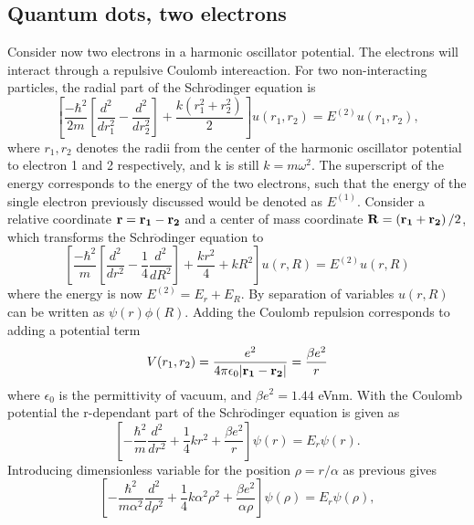\documentclass{emulateapj}
\begin{document}
\subsection{Quantum dots, two electrons}
Consider now two electrons in a harmonic oscillator potential. The electrons will interact through a repulsive Coulomb intereaction. For two non-interacting particles, the radial part of the Schr$\ddot{\mathrm{o}}$dinger equation is
%
\begin{equation*}
    \left[\frac{-\hbar^2}{2m}\left[\frac{d^2}{dr_1^2} - \frac{d^2}{dr_2^2}\right] + \frac{k\left(r_1^2 + r_2^2\right)}{2}\right]u(r_1,r_2) = E^{(2)}u(r_1,r_2),
\end{equation*}
%
where $r_1, r_2$ denotes the radii from the center of the harmonic oscillator potential to electron 1 and 2 respectively, and k is still $k = m\omega^2$. The superscript of the energy corresponds to the energy of the two electrons, such that the energy of the single electron previously discussed would be denoted as $E^{(1)}$. Consider a relative coordinate $\bold{r} = \bold{r_1} - \bold{r_2}$ and a center of mass coordinate $\bold{R} = \left(\bold{r_1} + \bold{r_2}\right)/2$, which transforms the Schr$\ddot{\mathrm{o}}$dinger equation to
%
\begin{equation*}
    \left[\frac{-\hbar^2}{m}\left[\frac{d^2}{dr^2} - \frac{1}{4}\frac{d^2}{dR^2}\right] + \frac{kr^2}{4} + kR^2\right]u(r,R) = E^{(2)}u(r,R)
\end{equation*}
%
where the energy is now $E^{(2)} = E_r + E_R$. By separation of variables $u(r,R)$ can be written as $\psi(r)\phi(R)$. Adding the Coulomb repulsion corresponds to adding a potential term
%
\begin{equation*}
    V(r_1,r_2) = \frac{e^2}{4\pi \epsilon_0 |\bold{r_1} - \bold{r_2}|} = \frac{\beta e^2}{r}
\end{equation*}
%
where $\epsilon_0$ is the permittivity of vacuum, and $\beta e^2 = 1.44$ eVnm. With the Coulomb potential the r-dependant part of the Schr$\ddot{\mathrm{o}}$dinger equation is given as
%
\begin{equation*}
    \left[-\frac{\hbar^2}{m}\frac{d^2}{dr^2} + \frac{1}{4}kr^2 + \frac{\beta e^2}{r}\right]\psi(r) = E_r \psi(r).
\end{equation*}
%
Introducing dimensionless variable for the position $\rho = r/\alpha$ as previous gives
%
\begin{equation*}
    \left[-\frac{\hbar^2}{m\alpha^2}\frac{d^2}{d\rho^2} + \frac{1}{4}k\alpha^2\rho^2 + \frac{\beta e^2}{\alpha\rho}\right]\psi(\rho) = E_r\psi(\rho),
\end{equation*}
\end{document}
